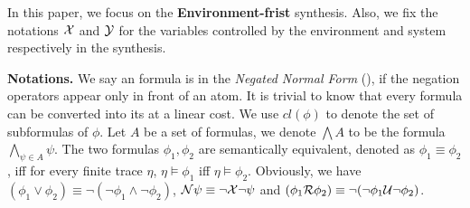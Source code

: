 In this paper, we focus on the \textbf{Environment-frist} \ltlf synthesis. Also, we fix the notations $\mathcal{X}$ and $\mathcal{Y}$ for the variables controlled by the environment and system respectively in the \ltlf synthesis.

\noindent\textbf{Notations.} 
We say an \ltlf formula is in the \emph{Negated Normal Form} (\NNF), if the negation operators appear only in front of an atom. It is trivial to know that every \ltlf formula can be converted into its \NNF at a linear cost. 
We use $cl(\phi)$ to denote the set of subformulas of $\phi$. 
Let $A$ be a set of \ltlf formulas, we denote $\bigwedge A$ to be the formula $\bigwedge_{\psi\in A}\psi$.
The two \ltlf formulas $\phi_1,\phi_2$ are semantically equivalent, denoted as $\phi_1\equiv\phi_2 $, iff for every finite trace $\eta$, $\eta\models\phi_1$ iff $\eta\models\phi_2$.  Obviously, we have $(\phi_1\vee\phi_2)\equiv \neg (\neg\phi_1 \wedge\neg \phi_2)$, 
$\mathcal{N}\psi\equiv \neg \mathcal{X}\neg\psi$ and $(\phi_1 \mathcal{R}\phi_2)\equiv \neg (\neg\phi_1 \mathcal{U}\neg \phi_2)$.




